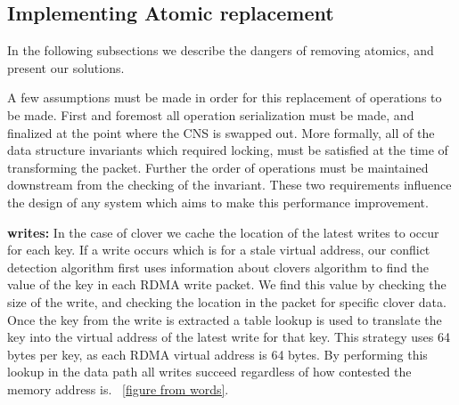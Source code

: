 \subsection{Implementing Atomic replacement}

In the
following subsections we describe the dangers of removing atomics, and present
our solutions.

A few assumptions must be made in order for this replacement of operations to be
made. First and foremost all operation serialization must be made, and finalized
at the point where the CNS is swapped out. More formally, all of the data
structure invariants which required locking, must be satisfied at the time of
transforming the packet. Further the order of operations must be maintained
downstream from the checking of the invariant. These two requirements influence
the design of any system which aims to make this performance improvement.

\textbf{writes:} In the case of clover we cache the location of the latest writes to occur for
each key. If a write occurs which is for a stale virtual address, our conflict
detection algorithm first uses information about clovers algorithm to find the
value of the key in each RDMA write packet. We find this value by checking the
size of the write, and checking the location in the packet for specific clover
data. Once the key from the write is extracted a table lookup is used to
translate the key into the virtual address of the latest write for that key.
This strategy uses 64 bytes per key, as each RDMA virtual address is 64 bytes.
By performing this lookup in the data path all writes succeed regardless of how
contested the memory address is. ~\ref{figure from words}.

